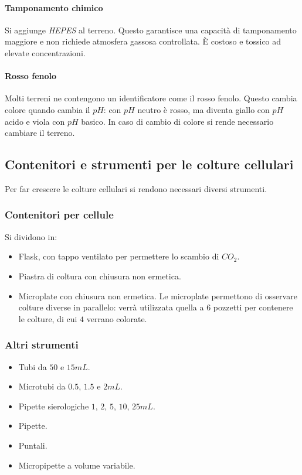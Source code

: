 			\paragraph{Tamponamento chimico}
			Si aggiunge \emph{HEPES} al terreno. 
			Questo garantisce una capacit\`a di tamponamento maggiore e non richiede atmosfera gassosa controllata.
			\`E costoso e tossico ad elevate concentrazioni.

			\paragraph{Rosso fenolo}
			Molti terreni ne contengono un identificatore come il rosso fenolo. 
			Questo cambia colore quando cambia il $pH$: con $pH$ neutro \`e rosso, ma diventa giallo con $pH$ acido e viola con $pH$ basico.
			In caso di cambio di colore si rende necessario cambiare il terreno. 
	
	\subsection{Contenitori e strumenti per le colture cellulari}
	Per far crescere le colture cellulari si rendono necessari diversi strumenti.
	
		\subsubsection{Contenitori per cellule}
		Si dividono in:
		\begin{itemize}
			\item Flask, con tappo ventilato per permettere lo scambio di \emph{$CO_2$}.
			\item Piastra di coltura con chiusura non ermetica.
			\item Microplate con chiusura non ermetica. 
				Le microplate permettono di osservare colture diverse in parallelo: verr\`a utilizzata quella a $6$ pozzetti per contenere le colture, di cui $4$ verrano colorate.
		\end{itemize}

		\subsubsection{Altri strumenti}
		\begin{multicols}{2}
			\begin{itemize}
				\item Tubi da $50$ e $15\si{mL}$.
				\item Microtubi da $0.5$, $1.5$ e $2\si{mL}$.
				\item Pipette sierologiche $1$, $2$, $5$, $10$, $25\si{mL}$.
				\item Pipette.
				\item Puntali.
				\item Micropipette a volume variabile.
			\end{itemize}
		\end{multicols}
	
